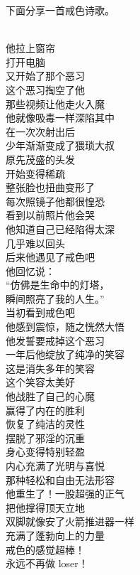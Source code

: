 下面分享一首戒色诗歌。

\begin{poem}[内在的胜利]
    \begin{multicols}{3}
        \centering~\\
        他拉上窗帘 \\ 打开电脑 \\ 又开始了那个恶习 \\ 这个恶习掏空了他 \\ 那些视频让他走火入魔 \\ 他就像吸毒一样深陷其中 \\ 在一次次射出后 \\ 少年渐渐变成了猥琐大叔 \\ 原先茂盛的头发 \\ 开始变得稀疏 \\ 整张脸也扭曲变形了 \\ 每次照镜子他都很惶恐 \\ 看到以前照片他会哭 \\ 他知道自己已经陷得太深 \\ 几乎难以回头 \\ 后来他遇见了戒色吧 \\ 他回忆说： \\ “仿佛是生命中的灯塔， \\ 瞬间照亮了我的人生。” \\ 当初看到戒色吧 \\ 他感到震惊，随之恍然大悟 \\ 他发誓要戒掉这个恶习 \\ 一年后他绽放了纯净的笑容 \\ 这是消失多年的笑容 \\ 这个笑容太美好 \\ 他战胜了自己的心魔 \\ 赢得了内在的胜利 \\ 恢复了纯洁的灵性 \\ 摆脱了邪淫的沉重 \\ 身心变得特别轻盈 \\ 内心充满了光明与喜悦 \\ 那种轻松和自由无法形容 \\ 他重生了！一股超强的正气 \\ 把他撑得顶天立地 \\ 双脚就像安了火箭推进器一样 \\ 充满了蓬勃向上的力量 \\ 戒色的感觉超棒！ \\ 永远不再做 loser！
    \end{multicols}
\end{poem}

